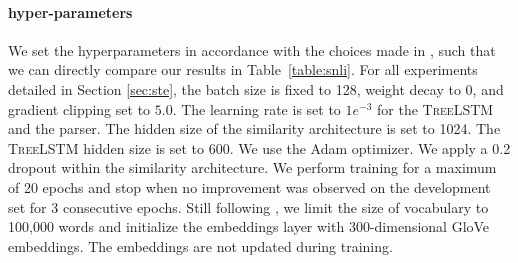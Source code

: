 


\paragraph{hyper-parameters} We set the hyperparameters in accordance with the choices made in \textcite{choi_18}, such that we can directly compare our results in Table~\ref{table:snli}. For all experiments detailed in Section \ref{sec:ste}, the batch size is fixed to 128, weight decay to $0$, and gradient clipping set to $5.0$. The learning rate is set to $1e^{-3}$ for the \textsc{TreeLSTM} and the parser. The hidden size of the similarity architecture is set to 1024. The \textsc{TreeLSTM} hidden size is set to 600. We use the Adam optimizer. We apply a 0.2 dropout within the similarity architecture. We perform training for a maximum of 20 epochs and stop when no improvement was observed on the development set for 3 consecutive epochs. Still following \textcite{choi_18}, we limit the size of vocabulary to 100,000 words and initialize the embeddings layer with 300-dimensional GloVe embeddings. The embeddings are not updated during training. %

